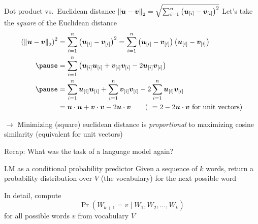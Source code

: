 \documentclass[12pt,aspectratio=169,handout]{beamer}
\begin{document}
\begin{frame}{Dot product vs.\ Euclidean distance $\norm{\bm{u} - \bm{v}}_{2} = \sqrt{\sum_{i = 1}^{n} \left( \bm{u}_{[i]} - \bm{v}_{[i]} \right)^2}$}
Let's take the \emph{square} of the Euclidean distance
	$$
	\begin{aligned}
		\left(\norm{\bm{u} - \bm{v}}_{2}\right)^2 &=
		\sum_{i = 1}^{n} \left( \bm{u}_{[i]} - \bm{v}_{[i]} \right)^2 
		=
		\sum_{i = 1}^{n} \left( \bm{u}_{[i]} - \bm{v}_{[i]} \right) \left( \bm{u}_{[i]} - \bm{v}_{[i]} \right) \\ \pause
		&=
		\sum_{i = 1}^{n} \left( \bm{u}_{[i]} \bm{u}_{[i]} + \bm{v}_{[i]} \bm{v}_{[i]} - 2 \bm{u}_{[i]} \bm{v}_{[i]} \right)  \\ \pause
		&= \sum_{i = 1}^{n}  \bm{u}_{[i]} \bm{u}_{[i]} + \sum_{i = 1}^{n} \bm{v}_{[i]} \bm{v}_{[i]} - 2 \sum_{i = 1}^{n} \bm{u}_{[i]} \bm{v}_{[i]} \\
		&= \bm{u} \cdot \bm{u} + \bm{v} \cdot \bm{v} - 2 \bm{u} \cdot \bm{v} \qquad
		\text{( } = 2 - 2 \bm{u} \cdot \bm{v} \text{ for unit vectors)}\\
	\end{aligned}
	$$
	
	\pause
	
$\to$ Minimizing (square) euclidean distance is \emph{proportional} to maximizing cosine similarity (equivalent for unit vectors)

	
	
\end{frame}





\begin{frame}{Recap: What was the task of a language model again?}

\begin{block}{LM as a conditional probability predictor}
Given a sequence of $k$ words, return a probability distribution over $V$ (the vocabulary) for the next possible word
\end{block}

In detail, compute
$$
\Pr(W_{k+1} = v \mid W_1, W_2, \ldots, W_k)
$$
for all possible words $v$ from vocabulary $V$

\end{frame}
\end{document}
